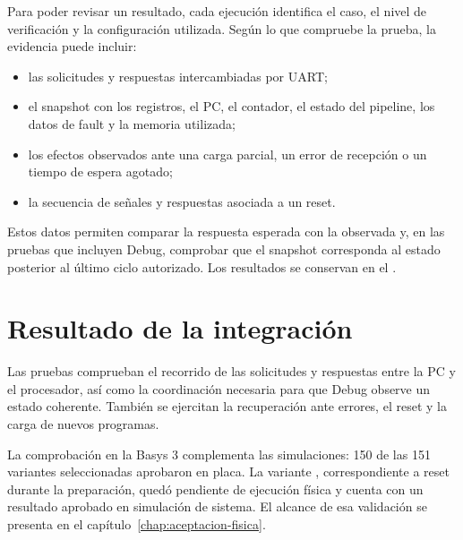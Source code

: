 Para poder revisar un resultado, cada ejecución identifica el caso, el nivel de
verificación y la configuración utilizada. Según lo que compruebe la prueba,
la evidencia puede incluir:

\begin{itemize}
  \item las solicitudes y respuestas intercambiadas por UART;
  \item el snapshot con los registros, el PC, el contador, el estado del
    pipeline, los datos de fault y la memoria utilizada;
  \item los efectos observados ante una carga parcial, un error de recepción o
    un tiempo de espera agotado;
  \item la secuencia de señales y respuestas asociada a un reset.
\end{itemize}

Estos datos permiten comparar la respuesta esperada con la observada y, en las
pruebas que incluyen Debug, comprobar que el snapshot corresponda al estado
posterior al último ciclo autorizado. Los resultados se conservan en el
.

\section{Resultado de la integración}

Las pruebas comprueban el recorrido de las solicitudes y respuestas entre la PC
y el procesador, así como la coordinación necesaria para que Debug observe un
estado coherente. También se ejercitan la recuperación ante errores, el reset
y la carga de nuevos programas.

La comprobación en la Basys 3 complementa las simulaciones: 150 de las 151
variantes seleccionadas aprobaron en placa. La variante
, correspondiente a reset durante la preparación, quedó
pendiente de ejecución física y cuenta con un resultado aprobado en simulación
de sistema. El alcance de esa validación se presenta en el
capítulo~\ref{chap:aceptacion-fisica}.
